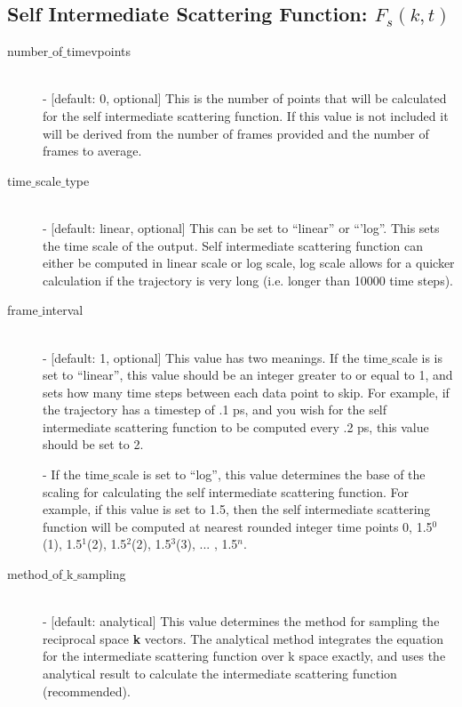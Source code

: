 \documentclass{article}
\begin{document}
\subsection{Self Intermediate Scattering Function: $F_s(k,t)$} \label{sec::Fsqt_parm}
\begin{description}	
	\item[number$\_$of$\_$timevpoints]\hfill \\
	- [default: 0, optional] This is the number of points that will be calculated for the self intermediate scattering function.  If this value is not included it will be derived from the number of frames provided and the number of frames to average.
	
	\item[time$\_$scale$\_$type] \hfill \\
	- [default: linear, optional] This can be set to ``linear'' or ``'log''.  This sets the time scale of the output. Self intermediate scattering function can either be computed in linear scale or log scale, log scale allows for a quicker calculation if the trajectory is very long (i.e. longer than 10000 time steps).
	
	\item[frame$\_$interval] \hfill \\
	- [default: 1, optional] This value has two meanings.  If the time$\_$scale is is set to ``linear'', this value should be an integer greater to or equal to 1, and sets how many time steps between each data point to skip.  For example, if the trajectory has a timestep of .1 ps, and you wish for the self intermediate scattering function to be computed every .2 ps, this value should be set to 2. 
	
	- If the time$\_$scale is set to ``log'', this value determines the base of the scaling for calculating the self intermediate scattering function.  For example, if this value is set to 1.5, then the self intermediate scattering function will be computed at nearest rounded integer time points 0, 1.5$^0$(1), 1.5$^1$(2), 1.5$^2$(2), 1.5$^3$(3), ... , 1.5$^{n}$.
	
	\item[method$\_$of$\_$k$\_$sampling] \hfill \\
	- [default: analytical] This value determines the method for sampling the reciprocal space \textbf{k} vectors.  The analytical method integrates the equation for the intermediate scattering function over k space exactly, and uses the analytical result to calculate the intermediate scattering function (recommended).
	

\end{description}
\end{document}
